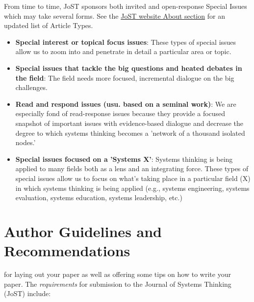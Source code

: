 \documentclass{tufte-handout}
\begin{document}
 From time to time, JoST sponsors both invited and open-response Special Issues which may take several forms. See the \href{https://journalofsystemsthinking.org/index.php/jost/about}{JoST website About section} for an updated list of Article Types.

\begin{itemize}
\item \textbf{Special interest or topical focus issues}: These types of special issues allow us to zoom into and penetrate in detail a particular area or topic.

\item \textbf{Special issues that tackle the big questions and heated debates in the field}: The field needs more focused, incremental dialogue on the big challenges. 

\item \textbf{Read and respond issues (usu. based on a seminal work)}: We are especially fond of read-response issues because they provide a focused snapshot of important issues with evidence-based dialogue and decrease the degree to which systems thinking becomes a 'network of a thousand isolated nodes.'

\item \textbf{Special issues focused on a 'Systems X'}: Systems thinking is being applied to many fields both as a lens and an integrating force. These types of special issues allow us to focus on what's taking place in a particular field (X) in which systems thinking is being applied (e.g., systems engineering, systems evaluation, systems education, systems leadership, etc.)
\end{itemize}



\section{Author Guidelines and Recommendations}\label{sec:author-recs} 
 for laying out your paper as well as offering some tips on how to write your paper. The \textit{requirements} for submission to the Journal of Systems Thinking (JoST) include:
\end{document}
